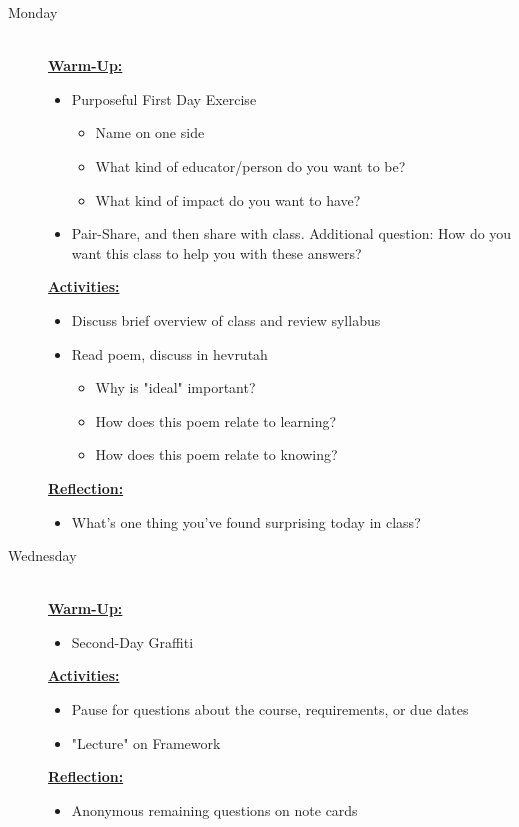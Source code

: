 \documentclass{article}
\newcommand{\tabbreak}{\begin{center}\faAsterisk\faAsterisk\faAsterisk\\\end{center}}
\newcommand{\listmon}{\item[\large\textsf{Monday}\normalsize] \hfill \\}
\newcommand{\listwed}{\item[\large\textsf{Wednesday}\normalsize] \hfill \\}
\newenvironment{daywu}
	{\underline{\textbf{Warm-Up:}} \hfill \\
	\begin{itemize}}
	{\end{itemize}}
\newenvironment{dayact}
	{\underline{\textbf{Activities:}} \hfill \\
	\begin{itemize}}
	{\end{itemize}}
\newenvironment{dayref}
	{\underline{\textbf{Reflection:}} \hfill \\
	\begin{itemize}}
	{\end{itemize}}
\newenvironment{weeksched}
	{\noindent
	\begin{description}}
	{\end{description}
	\newpage}
\begin{document}
\begin{weeksched}

\listmon
\begin{daywu}
	\item Purposeful First Day Exercise
		\begin{itemize}
			\item Name on one side
			\item What kind of educator/person do you want to be?
			\item What kind of impact do you want to have?
		\end{itemize}
	\item Pair-Share, and then share with class. Additional question: How do you want this class to help you with these answers?
\end{daywu}
\begin{dayact}
	\item Discuss brief overview of class and review syllabus
	\item Read poem, discuss in hevrutah
	\begin{itemize}
		\item Why is "ideal" important?
		\item How does this poem relate to learning?
		\item How does this poem relate to knowing?
	\end{itemize}
\end{dayact}
\begin{dayref}
	\item What's one thing you've found surprising today in class?
\end{dayref}

\listwed
\begin{daywu}
	\item Second-Day Graffiti
\end{daywu}
\begin{dayact}
	\item Pause for questions about the course, requirements, or due dates
	\item "Lecture" on Framework
\end{dayact}
\begin{dayref}
	\item Anonymous remaining questions on note cards
\end{dayref}
\end{weeksched}
\tabbreak
\end{document}

